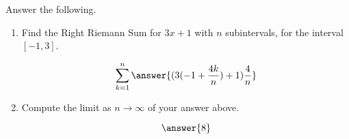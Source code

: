 \documentclass{ximera}
\author{Gregory Hartman \and Matthew Carr}
\begin{document}
\begin{exercise}


Answer the following.

\begin{enumerate}
\item Find the Right Riemann Sum for $3x+1$ with $n$ subintervals, for the interval $[-1,3]$.
\begin{prompt}
\[
\sum_{k=1}^n \answer{(3(-1+\frac{4k}{n})+1)\frac{4}{n}}
\]
\end{prompt}
\item Compute the limit as $n\to\infty$ of your answer above. \begin{prompt} \[\answer{8}\]
\end{prompt}

\end{enumerate}
\end{exercise}
\end{document}
